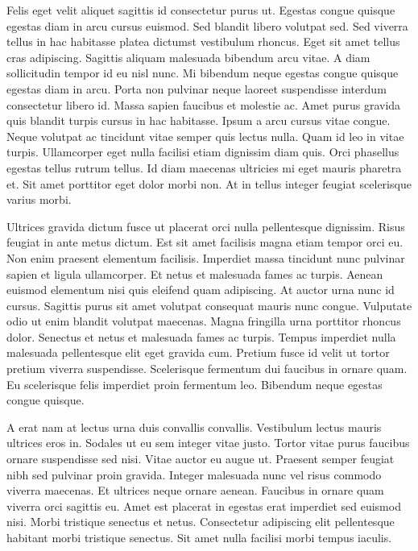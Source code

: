 \documentclass[11pt,a4paper]{article}
\begin{document}
Felis eget velit aliquet sagittis id consectetur purus ut. Egestas congue quisque egestas diam in arcu cursus euismod. Sed blandit libero volutpat sed. Sed viverra tellus in hac habitasse platea dictumst vestibulum rhoncus. Eget sit amet tellus cras adipiscing. Sagittis aliquam malesuada bibendum arcu vitae. A diam sollicitudin tempor id eu nisl nunc. Mi bibendum neque egestas congue quisque egestas diam in arcu. Porta non pulvinar neque laoreet suspendisse interdum consectetur libero id. Massa sapien faucibus et molestie ac. Amet purus gravida quis blandit turpis cursus in hac habitasse. Ipsum a arcu cursus vitae congue. Neque volutpat ac tincidunt vitae semper quis lectus nulla. Quam id leo in vitae turpis. Ullamcorper eget nulla facilisi etiam dignissim diam quis. Orci phasellus egestas tellus rutrum tellus. Id diam maecenas ultricies mi eget mauris pharetra et. Sit amet porttitor eget dolor morbi non. At in tellus integer feugiat scelerisque varius morbi.

Ultrices gravida dictum fusce ut placerat orci nulla pellentesque dignissim. Risus feugiat in ante metus dictum. Est sit amet facilisis magna etiam tempor orci eu. Non enim praesent elementum facilisis. Imperdiet massa tincidunt nunc pulvinar sapien et ligula ullamcorper. Et netus et malesuada fames ac turpis. Aenean euismod elementum nisi quis eleifend quam adipiscing. At auctor urna nunc id cursus. Sagittis purus sit amet volutpat consequat mauris nunc congue. Vulputate odio ut enim blandit volutpat maecenas. Magna fringilla urna porttitor rhoncus dolor. Senectus et netus et malesuada fames ac turpis. Tempus imperdiet nulla malesuada pellentesque elit eget gravida cum. Pretium fusce id velit ut tortor pretium viverra suspendisse. Scelerisque fermentum dui faucibus in ornare quam. Eu scelerisque felis imperdiet proin fermentum leo. Bibendum neque egestas congue quisque.

A erat nam at lectus urna duis convallis convallis. Vestibulum lectus mauris ultrices eros in. Sodales ut eu sem integer vitae justo. Tortor vitae purus faucibus ornare suspendisse sed nisi. Vitae auctor eu augue ut. Praesent semper feugiat nibh sed pulvinar proin gravida. Integer malesuada nunc vel risus commodo viverra maecenas. Et ultrices neque ornare aenean. Faucibus in ornare quam viverra orci sagittis eu. Amet est placerat in egestas erat imperdiet sed euismod nisi. Morbi tristique senectus et netus. Consectetur adipiscing elit pellentesque habitant morbi tristique senectus. Sit amet nulla facilisi morbi tempus iaculis.
\end{document}
